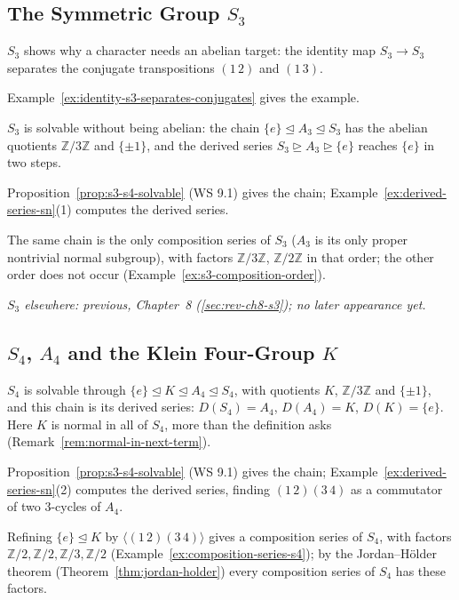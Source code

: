 \documentclass[11pt]{report}
\begin{document}
\subsection{\texorpdfstring{The Symmetric Group $S_3$}{The Symmetric Group S₃}}\label{sec:rev-ch9-s3}

$S_3$ shows why a character needs an abelian target: the identity map $S_3 \to S_3$ separates the conjugate transpositions $(1\,2)$ and $(1\,3)$.

Example~\ref{ex:identity-s3-separates-conjugates} gives the example.

$S_3$ is solvable without being abelian: the chain $\{e\} \trianglelefteq A_3 \trianglelefteq S_3$ has the abelian quotients $\mathbb{Z}/3\mathbb{Z}$ and $\{\pm 1\}$, and the derived series $S_3 \trianglerighteq A_3 \trianglerighteq \{e\}$ reaches $\{e\}$ in two steps.

Proposition~\ref{prop:s3-s4-solvable} (WS 9.1) gives the chain; Example~\ref{ex:derived-series-sn}(1) computes the derived series.

The same chain is the only composition series of $S_3$ ($A_3$ is its only proper nontrivial normal subgroup), with factors $\mathbb{Z}/3\mathbb{Z}$, $\mathbb{Z}/2\mathbb{Z}$ in that order; the other order does not occur (Example~\ref{ex:s3-composition-order}).

\textit{$S_3$ elsewhere: previous, Chapter~8 (\ref{sec:rev-ch8-s3}); no later appearance yet.}

\subsection{\texorpdfstring{$S_4$, $A_4$ and the Klein Four-Group $K$}{S₄, A₄ and the Klein Four-Group K}}\label{sec:rev-ch9-s4}

$S_4$ is solvable through $\{e\} \trianglelefteq K \trianglelefteq A_4 \trianglelefteq S_4$, with quotients $K$, $\mathbb{Z}/3\mathbb{Z}$ and $\{\pm 1\}$, and this chain is its derived series: $D(S_4) = A_4$, $D(A_4) = K$, $D(K) = \{e\}$. Here $K$ is normal in all of $S_4$, more than the definition asks (Remark~\ref{rem:normal-in-next-term}).

Proposition~\ref{prop:s3-s4-solvable} (WS 9.1) gives the chain; Example~\ref{ex:derived-series-sn}(2) computes the derived series, finding $(1\,2)(3\,4)$ as a commutator of two $3$-cycles of $A_4$.

Refining $\{e\} \trianglelefteq K$ by $\langle (1\,2)(3\,4) \rangle$ gives a composition series of $S_4$, with factors $\mathbb{Z}/2, \mathbb{Z}/2, \mathbb{Z}/3, \mathbb{Z}/2$ (Example~\ref{ex:composition-series-s4}); by the Jordan--H\"older theorem (Theorem~\ref{thm:jordan-holder}) every composition series of $S_4$ has these factors.
\end{document}
